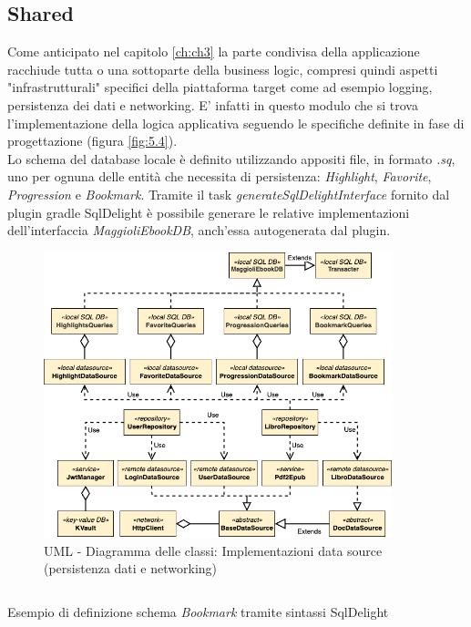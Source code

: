 \subsection{Shared}
Come anticipato nel capitolo \ref{ch:ch3} la parte condivisa della applicazione racchiude tutta o una sottoparte della business logic, compresi quindi aspetti "infrastrutturali" specifici della piattaforma target come ad esempio logging, persistenza dei dati e networking. E' infatti in questo modulo che si trova l'implementazione della logica applicativa seguendo le specifiche definite in fase di progettazione (figura \ref{fig:5.4}).\\
Lo schema del database locale è definito utilizzando appositi file, in formato \textit{.sq}, uno per ognuna delle entità che necessita di persistenza: \textit{Highlight}, \textit{Favorite}, \textit{Progression} e \textit{Bookmark}. Tramite il task \textit{generateSqlDelightInterface} fornito dal plugin gradle SqlDelight è possibile generare le relative implementazioni dell'interfaccia \textit{MaggioliEbookDB}, anch'essa autogenerata dal plugin. 

\begin{figure}[H]
\centering
\includegraphics[width=0.9\textwidth]{img/tesi-26-shareduml.drawio.png}
\caption{UML - Diagramma delle classi: Implementazioni data source (persistenza dati e networking)}
\end{figure}

\begin{listing}[H]
\inputminted{sql}{code/5-sqldelight}
\caption{Esempio di definizione schema \textit{Bookmark} tramite sintassi SqlDelight}
\end{listing}

